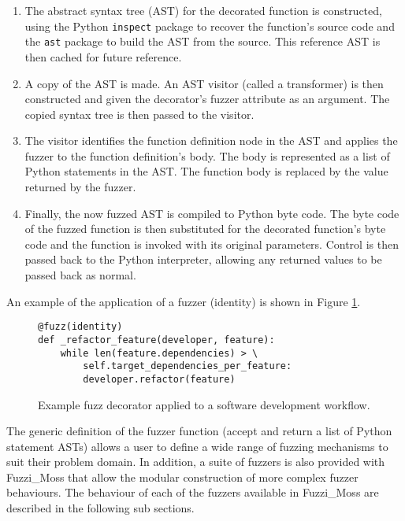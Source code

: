 \documentclass{sig-alternate}
\begin{document}
\begin{enumerate}

\item The abstract syntax tree (AST) for the decorated function is constructed,
  using the Python \lstinline!inspect! package to recover the function's source
  code and the \lstinline!ast!  package to build the AST from the source.  This
  reference AST is then cached for future reference.

\item A copy of the AST is made.  An AST visitor (called a transformer) is then
  constructed and given the decorator's fuzzer attribute as an argument.  The
  copied syntax tree is then passed to the visitor.

\item The visitor identifies the function definition node in the AST and applies
  the fuzzer to the function definition's body.  The body is represented as a
  list of Python statements in the AST.  The function body is replaced by the
  value returned by the fuzzer.

\item Finally, the now fuzzed AST is compiled to Python byte code.  The byte
  code of the fuzzed function is then substituted for the decorated function's
  byte code and the function is invoked with its original parameters.  Control
  is then passed back to the Python interpreter, allowing any returned values to
  be passed back as normal.

\end{enumerate}

An example of the application of a fuzzer (identity) is shown in Figure
\ref{fig:fuzz}.

 \begin{figure}
   \centering
  \begin{lstlisting}
@fuzz(identity)
def _refactor_feature(developer, feature):
    while len(feature.dependencies) > \
        self.target_dependencies_per_feature:
        developer.refactor(feature)
  \end{lstlisting}
  
  \caption{Example fuzz decorator applied to a software development workflow.}
  \label{fig:fuzz}
\end{figure}

The generic definition of the fuzzer function (accept and return a list of
Python statement ASTs) allows a user to define a wide range of fuzzing
mechanisms to suit their problem domain.  In addition, a suite of fuzzers is
also provided with Fuzzi\_Moss that allow the modular construction of more
complex fuzzer behaviours.  The behaviour of each of the fuzzers available in
Fuzzi\_Moss are described in the following sub sections.
\end{document}
